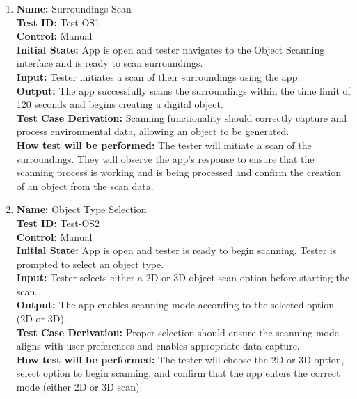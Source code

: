 \documentclass[12pt, titlepage]{article}
\begin{document}
\begin{enumerate}

  \item \textbf{Name:} Surroundings Scan \label{itm:Test-OS1} \\
        \textbf{Test ID:} Test-OS1 \\
        \textbf{Control:} Manual \\
        \textbf{Initial State:} App is open and tester navigates to the Object Scanning interface and is ready to scan surroundings. \\
        \textbf{Input:} Tester initiates a scan of their surroundings using the app. \\
        \textbf{Output:} The app successfully scans the surroundings within the time limit of 120 seconds and begins creating a digital object. \\
        \textbf{Test Case Derivation:} Scanning functionality should correctly capture and process environmental data, allowing an object to be generated. \\
        \textbf{How test will be performed:} The tester will initiate a scan of the surroundings. They will observe the app's response to ensure that the scanning process is working and is being processed and confirm the creation of an object from the scan data.

  \item \textbf{Name:} Object Type Selection \label{itm:Test-OS2} \\
        \textbf{Test ID:} Test-OS2 \\
        \textbf{Control:} Manual \\
        \textbf{Initial State:} App is open and tester is ready to begin scanning. Tester is prompted to select an object type. \\
        \textbf{Input:} Tester selects either a 2D or 3D object scan option before starting the scan. \\
        \textbf{Output:} The app enables scanning mode according to the selected option (2D or 3D). \\
        \textbf{Test Case Derivation:} Proper selection should ensure the scanning mode aligns with user preferences and enables appropriate data capture. \\
        \textbf{How test will be performed:} The tester will choose the 2D or 3D option, select option to begin scanning, and confirm that the app enters the correct mode (either 2D or 3D scan).


\end{enumerate}
\end{document}
